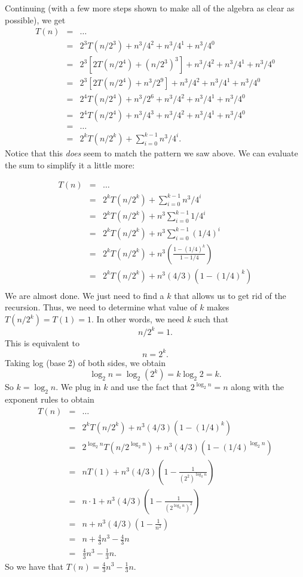 \begin{exa}
\begin{sol}
Continuing (with a few more steps shown to make all of the algebra as clear as possible), we get
\begin{eqnarray*}
T(n)&=&\ldots\\
    &=&2^3T(n/2^3)+n^3/4^2+n^3/4^1+n^3/4^0\\
    &=&2^3[2T(n/2^4)+(n/2^3)^3]+n^3/4^2+n^3/4^1+n^3/4^0\\
    &=&2^3[2T(n/2^4)+n^3/2^9]+n^3/4^2+n^3/4^1+n^3/4^0\\
    &=&2^4T(n/2^4)+n^3/2^6+n^3/4^2+n^3/4^1+n^3/4^0\\
    &=&2^4T(n/2^4)+n^3/4^3+n^3/4^2+n^3/4^1+n^3/4^0\\
    &=&\ldots\\
    &=&2^kT(n/2^k)+\sum_{i=0}^{k-1} n^3/4^i.
\end{eqnarray*}
Notice that this {\em does} seem to match the pattern we saw above.
We can evaluate the sum to simplify it a little more:

\begin{eqnarray*}
T(n)&=&\ldots\\
    &=&2^kT(n/2^k)+\sum_{i=0}^{k-1} n^3/4^i\\
    &=&2^kT(n/2^k)+n^3\sum_{i=0}^{k-1} 1/4^i\\
    &=&2^kT(n/2^k)+n^3\sum_{i=0}^{k-1} (1/4)^i\\
    &=&2^kT(n/2^k)+n^3\left(\frac{1-(1/4)^k}{1-1/4}\right)\\
    &=&2^kT(n/2^k)+n^3(4/3)(1-(1/4)^k)\\
\end{eqnarray*}
We are almost done.  We just need to find a $k$ that allows us to get rid of the recursion.
Thus, we need to determine what value of $k$ makes $T(n/2^k)=T(1)=1$.  In other words, we need
$k$ such that  
$$n/2^k=1.$$
This is equivalent to 
$$n=2^k.$$
Taking log (base 2) of both sides, we obtain 
$$\log_2 n=\log_2(2^k)=k\log_{2} 2=k.$$  
So $k=\log_2 n$.
We plug in $k$ and use the fact that $2^{\log_2 n}=n$ along with the exponent rules to obtain
\begin{eqnarray*}
T(n)&=&\ldots\\
    &=&2^kT(n/2^k)+n^3(4/3)(1-(1/4)^k)\\
    &=&2^{\log_2 n}T(n/2^{\log_2 n})+n^3(4/3)(1-(1/4)^{\log_2 n})\\
    &=&nT(1)+n^3(4/3)\left(1-\frac{1}{(2^2)^{\log_2 n}}\right)\\
    &=&n\cdot 1+n^3(4/3)\left(1-\frac{1}{(2^{\log_2 n})^2}\right)\\
    &=&n+n^3(4/3)\left(1-\frac{1}{n^2}\right)\\
    &=&n+\frac{4}{3}n^3-\frac{4}{3}n\\
    &=&\frac{4}{3}n^3-\frac{1}{3}n.
\end{eqnarray*}
So we have that $T(n)=\frac{4}{3}n^3-\frac{1}{3}n$.
\end{sol}
\end{exa}

